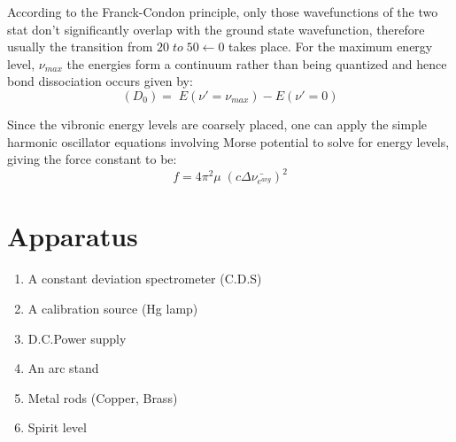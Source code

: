 According to the Franck-Condon principle, only those wavefunctions of the two stat don't significantly overlap with the ground state wavefunction, therefore usually the transition from $20\; to\;50\leftarrow0$ takes place. For the maximum energy level, $\nu_{max}$ the energies form a continuum rather than being quantized and hence bond dissociation occurs given by:
$$(D_0)=\;E(\nu'=\nu_{max})-E(\nu'=0)$$

Since the vibronic energy levels are coarsely placed, one can apply the simple harmonic oscillator equations involving Morse potential to solve for energy levels, giving the force constant to be: 
$$f=4\pi^2 \mu\;(c\Delta\bar{\nu_{e^{avg}}})^2$$


\section{Apparatus}

\begin{enumerate}
    \item A constant deviation spectrometer (C.D.S)
    \item A calibration source (Hg lamp)
    \item D.C.Power supply
    \item An arc stand
    \item Metal rods (Copper, Brass)
    \item Spirit level
\end{enumerate}